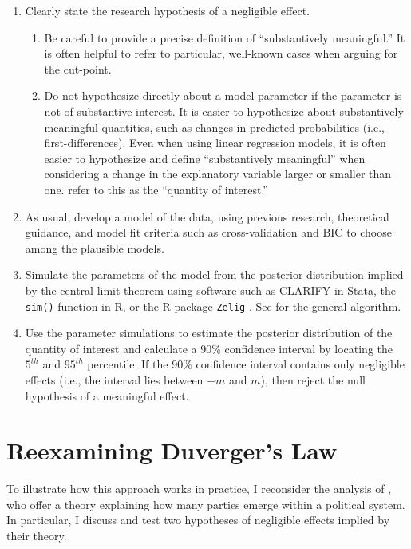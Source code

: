 \documentclass[12pt]{article}
\begin{document}
\begin{enumerate}
\item Clearly state the research hypothesis of a negligible effect.
\begin{enumerate}
\item Be careful to provide a precise definition of ``substantively meaningful.'' It is often helpful to refer to particular, well-known cases when arguing for the cut-point.
\item Do not hypothesize directly about a model parameter if the parameter is not of substantive interest. It is easier to  hypothesize about substantively meaningful quantities, such as changes in predicted probabilities (i.e., first-differences). Even when using linear regression models, it is often easier to hypothesize and define ``substantively meaningful'' when considering a change in the explanatory variable larger or smaller than one. \cite{KingTomzWhittenburg2000} refer to this as the ``quantity of interest.''
\end{enumerate} 
\item As usual, develop a model of the data, using previous research, theoretical guidance, and model fit criteria such as cross-validation and BIC to choose among the plausible models.
\item Simulate the parameters of the model from the posterior distribution implied by the central limit theorem using software such as CLARIFY \citep{KingTomzWhittenburg2000} in Stata, the \texttt{sim()} function \citep{GelmanHill2007} in R, or the R package \texttt{Zelig} \citep{ImaiKingLau2008}. See \cite{KingTomzWhittenburg2000} for the general algorithm.
\item Use the parameter simulations to estimate the posterior distribution of the quantity of interest and calculate a 90\% confidence interval by locating the $5^{th}$ and $95^{th}$ percentile. If the 90\% confidence interval contains only negligible effects (i.e., the interval lies between $-m$ and $m$), then reject the null hypothesis of a meaningful effect.
\end{enumerate}


\section*{Reexamining Duverger's Law}

To illustrate how this approach works in practice, I reconsider the analysis of \cite{ClarkGolder2006}, who offer a theory explaining  how many parties emerge within a political system. In particular, I discuss and test two hypotheses of negligible effects implied by their theory.
\end{document}
